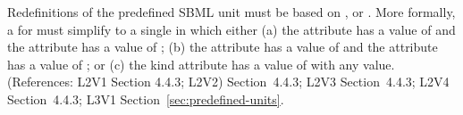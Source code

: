 Redefinitions of the predefined SBML unit  must be
based on ,  or .  More
formally, a \UnitDefinition for  must simplify to a single
\Unit in which either (a) the  attribute has
a value of  and the  attribute has a value of
; (b) the  attribute has a value of
 and the  attribute has a value of ; or
(c) the kind attribute has a value of  with
any  value.  (References: L2V1 Section 4.4.3; L2V2)
Section~4.4.3; L2V3 Section~4.4.3; L2V4 Section~4.4.3; L3V1
Section~\ref{sec:predefined-units}.
